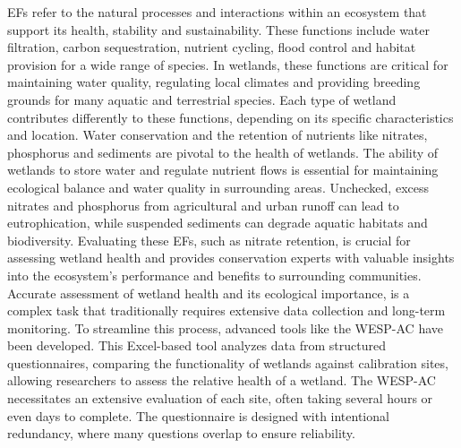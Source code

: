 \documentclass[12pt,letterpaper]{article}
\begin{document}
\ac{EF}s refer to the natural processes and interactions within an ecosystem that support its health, stability and sustainability.
These functions include water filtration, carbon sequestration, nutrient cycling, flood control and habitat provision for a wide range of species.
In wetlands, these functions are critical for maintaining water quality, regulating local climates and providing breeding grounds for many aquatic and terrestrial species.
Each type of wetland contributes differently to these functions, depending on its specific characteristics and location.
Water conservation and the retention of nutrients like nitrates, phosphorus and sediments are pivotal to the health of wetlands.
The ability of wetlands to store water and regulate nutrient flows is essential for maintaining ecological balance and water quality in surrounding areas.
Unchecked, excess nitrates and phosphorus from agricultural and urban runoff can lead to eutrophication, while suspended sediments can degrade aquatic habitats and biodiversity.
Evaluating these \ac{EF}s, such as nitrate retention, is crucial for assessing wetland health and provides conservation experts with valuable insights into the ecosystem’s performance and benefits to surrounding communities.
Accurate assessment of wetland health and its ecological importance, is a complex task that traditionally requires extensive data collection and long-term monitoring.
To streamline this process, advanced tools like the \ac{WESP-AC} have been developed.
This Excel-based tool analyzes data from structured questionnaires, comparing the functionality of wetlands against calibration sites, allowing researchers to assess the relative health of a wetland.
The \ac{WESP-AC} necessitates an extensive evaluation of each site, often taking several hours or even days to complete.
The questionnaire is designed with intentional redundancy, where many questions overlap to ensure reliability.
\end{document}
